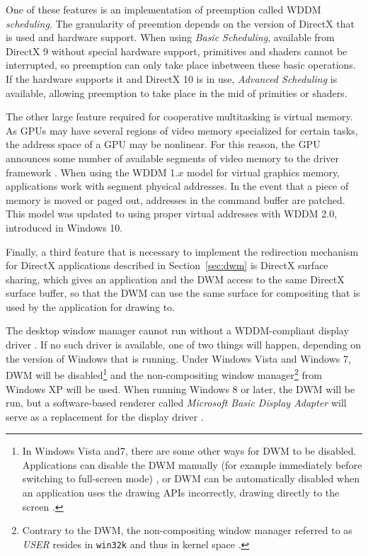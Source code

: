 \documentclass[10pt,twocolumn,a4paper]{article}
\begin{document}
			One of these features is an implementation of preemption called
			WDDM \emph{scheduling}. The granularity of preemtion depends on
			the version of DirectX that is used and hardware support. When
			using \emph{Basic Scheduling}, available from DirectX 9 without
			special hardware support, primitives and shaders cannot be interrupted,
			so preemption can only take place inbetween these basic operations.
			If the hardware supports it and DirectX 10 is in use, \emph{Advanced
			Scheduling} is available, allowing preemption to take place in the mid
			of primities or shaders. \cite{dwmwddm}

			The other large feature required for cooperative multitasking is
			virtual memory. As GPUs may have several regions of video memory
			specialized for certain tasks, the address space of a GPU may
			be nonlinear. For this reason, the GPU announces some number of
			available segments of video memory to the driver framework \cite{gpuseg}.
			When using the WDDM 1.$x$ model for virtual graphics
			memory, applications work with segment physical addresses. In the event
			that a piece of memory is moved or paged out, addresses in the command
			buffer are patched. This model was updated to using proper virtual
			addresses with WDDM 2.0, introduced in Windows 10. \cite{wddm2}

			Finally, a third feature that is necessary to implement the redirection
			mechanism for DirectX applications described in Section~\ref{sec:dwm}
			is DirectX surface sharing, which gives an application and the DWM
			access to the same DirectX surface buffer, so that the DWM can use the
			same surface for compositing that is used by the application for
			drawing to. \cite{dwmredirect}

			The desktop window manager cannot run without a WDDM-compliant
			display driver \cite{dwmwddm}. If no such driver is available, one
			of two things will happen, depending on the version of Windows that
			is running. Under Windows Vista and Windows 7, DWM will be
			disabled\footnote{In Windows Vista and7, there are some other ways for
			DWM to be disabled. Applications can disable the DWM manually (for
			example immediately before switching to full-screen mode)
			\cite{disabledwm}, or DWM can be automatically disabled when an
			application uses the drawing APIs incorrectly, drawing directly
			to the screen \cite{dwmredirect}.}
			and the non-compositing window manager\footnote{Contrary to the DWM,
			the non-compositing window manager referred to as \textit{USER} resides
			in \texttt{win32k} and thus in kernel space \cite{probertwin32k}.}
			from Windows XP will be used. When running Windows 8 or later,
			the DWM will be run, but a software-based renderer called
			\textit{Microsoft Basic Display Adapter} will serve as a replacement
			for the display driver \cite{dwmalwayson}.
\end{document}
